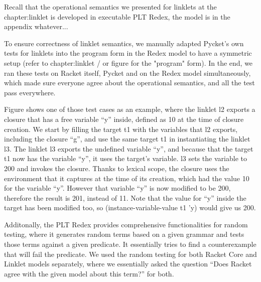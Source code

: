 			\begin{paragraph-here}%
				Recall that the operational semantics we presented for linklets at the chapter:linklet is developed in executable PLT Redex, the model is in the appendix whatever...
			\end{paragraph-here}

			\begin{paragraph-here}%
				To ensure correctness of linklet semantics, we manually adapted Pycket's own tests for linklets into the program form in the Redex model to have a symmetric setup (refer to chapter:linklet / or figure for the "program" form). In the end, we ran these tests on Racket itself, Pycket and on the Redex model simultaneously, which made sure everyone agree about the operational semantics, and all the test pass everywhere.
			\end{paragraph-here}


			\begin{paragraph-here}%
				Figure  shows one of those test cases as an example, where the linklet l2 exports a closure that has a free variable “y” inside, defined as 10 at the time of closure creation. We start by filling the target t1 with the variables that l2 exports, including the closure “g”, and use the same target t1 in instantiating the linklet l3. The linklet l3 exports the undefined variable “y”, and because that the target t1 now has the variable “y”, it uses the target’s variable. l3 sets the variable to 200 and invokes the closure. Thanks to lexical scope, the closure uses the environment that it captures at the time of its creation, which had the value 10 for the variable “y”. However that variable “y” is now modified to be 200, therefore the result is 201, instead of 11. Note that the value for “y” inside the target has been modified too, so (instance-variable-value t1 ’y) would give us 200.
			\end{paragraph-here}

			\begin{paragraph-here}%
				Additonally, the PLT Redex provides comprehensive functionalities for random testing, where it generates random terms based on a given grammar and tests those terms against a given predicate. It essentially tries to find a counterexample that will fail the predicate. We used the random testing for both Racket Core and Linklet models separately, where we essentially asked the question “Does Racket agree with the given model about this term?” for both.
			\end{paragraph-here}

